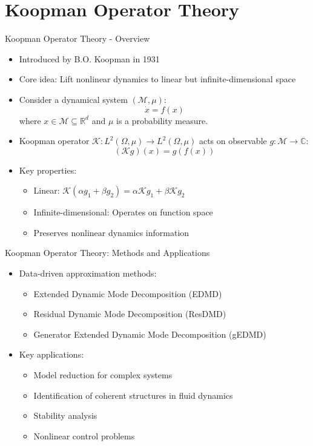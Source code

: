 \documentclass{beamer}
\begin{document}
	\section{Koopman Operator Theory}
	\begin{frame}{Koopman Operator Theory - Overview}
		\begin{itemize}
			\item Introduced by B.O. Koopman in 1931
			\item Core idea: Lift nonlinear dynamics to linear but infinite-dimensional space
			\item Consider a dynamical system $(\mathcal{M}, \mu)$: 
			$$\dot{x} = f(x)$$
			where $x \in \mathcal{M} \subseteq \mathbb{R}^d$ and $\mu$ is a probability measure.
			\item Koopman operator $\mathcal{K}: L^2(\Omega, \mu) \to L^2(\Omega, \mu) $ acts on observable $g: \mathcal{M} \to \mathbb{C}$:
			\begin{equation*}
				(\mathcal{K}g)(x) = g(f(x))
			\end{equation*}
			\item Key properties:
			\begin{itemize}
				\item Linear: $\mathcal{K}(\alpha g_1 + \beta g_2) = \alpha \mathcal{K}g_1 + \beta \mathcal{K}g_2$
				\item Infinite-dimensional: Operates on function space
				\item Preserves nonlinear dynamics information
			\end{itemize}
		\end{itemize}
	\end{frame}
	
	\begin{frame}{Koopman Operator Theory: Methods and Applications}
		\begin{itemize}
			\item Data-driven approximation methods:
			\begin{itemize}
				\item Extended Dynamic Mode Decomposition (EDMD)
				\item Residual Dynamic Mode Decomposition (ResDMD)
				\item Generator Extended Dynamic Mode Decomposition (gEDMD)
			\end{itemize}
			\item Key applications:
			\begin{itemize}
				\item Model reduction for complex systems
				\item Identification of coherent structures in fluid dynamics
				\item Stability analysis
				\item Nonlinear control problems
			\end{itemize}
		\end{itemize}
	\end{frame}
	
\end{document}
